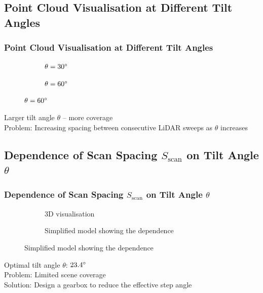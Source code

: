 \documentclass[169]{beamer}
\begin{document}
\subsection{Point Cloud Visualisation at Different Tilt Angles}
\begin{frame}
\frametitle{Point Cloud Visualisation at Different Tilt Angles}
\begin{figure}[h!]
    \centering
    
    \begin{subfigure}{0.45\linewidth}
        \centering
        
        \caption{$\theta=30\degree$}
        \label{fig:rotate_pointCloud:30}
    \end{subfigure}
    \hfill
    \begin{subfigure}{0.45\linewidth}
        \centering
        
        \caption{$\theta=60\degree$}
        \label{fig:rotate_pointCloud:60}
    \end{subfigure}
    \label{fig:rotate_pointCloud}
\end{figure}
\begin{minipage}{10cm}
Larger tilt angle $\theta$ -- more coverage \\\pause
{\color{red} Problem:} Increasing spacing between consecutive LiDAR sweeps as $\theta$ increases
\end{minipage}
\end{frame}



\subsection{Dependence of Scan Spacing $S_{\text{scan}}$ on Tilt Angle $\theta$}
\begin{frame}
    \frametitle{Dependence of Scan Spacing $S_{\text{scan}}$ on Tilt Angle $\theta$}
    \begin{figure}
    \begin{subfigure}{0.4\linewidth}
        \centering
        
        \caption{3D visualisation}
        \label{fig:scan_spacing:3d}
    \end{subfigure}
    \hfill
    \begin{subfigure}{0.53\linewidth}
        \centering
        
        \caption{Simplified model showing the dependence}
        \label{fig:scan_spacing:tikz}
    \end{subfigure}
    \label{fig:scan_spacing}
\end{figure}
\begin{minipage}{10cm}
Optimal tilt angle $\theta$: {\color{red} $23.4\degree$}\\\pause
{\color{red}Problem:} Limited scene coverage\\\pause
{\color{cvut_navy} Solution:} Design a gearbox to reduce the effective step angle
\end{minipage}
\end{frame}
\end{document}

